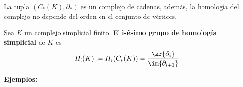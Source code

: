 \documentclass{article}
\begin{document}
\vspace{2mm}
\begin{teo}
    La tupla $(C_{*}(K),\partial_{*})$ es un complejo de cadenas, además, la homología del 
    complejo no depende del orden en el conjunto de vértices.
\end{teo}

\vspace{2mm}
\begin{dfn}
    Sea $K$ un complejo simplicial finito. El \textbf{i-ésimo grupo de homología simplicial} de 
    $K$ es
    \begin{equation*}
        H_{i}(K):=H_{i}(C_{*}(K))=\frac{\kr{\partial_{i}}}{\im{\partial_{i+1}}}
    \end{equation*}
\end{dfn}

\noindent\textbf{Ejemplos:}
\end{document}
